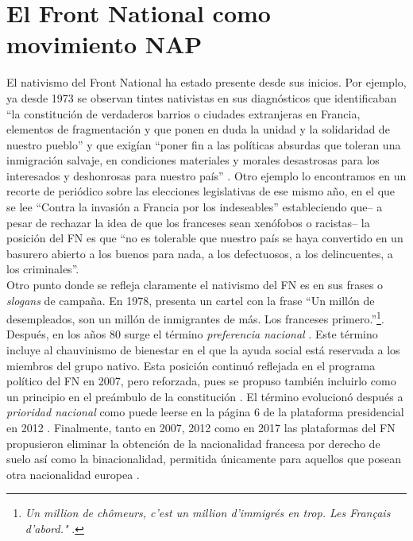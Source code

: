 \section{El Front National como movimiento NAP}

El nativismo del Front National ha estado presente desde sus inicios. Por ejemplo, ya desde 1973 se observan tintes nativistas en sus diagnósticos que identificaban ``la constitución de verdaderos barrios o ciudades extranjeras en Francia, elementos de fragmentación y que ponen en duda la unidad y la solidaridad de nuestro pueblo'' y que exigían ``poner fin a las políticas absurdas que toleran una inmigración salvaje, en condiciones materiales y morales desastrosas para los interesados y deshonrosas para nuestro país'' \parencite[traducción propia]{LeMonde12}. Otro ejemplo lo encontramos en un recorte de periódico sobre las elecciones legislativas de ese mismo año, en el que se lee ``Contra la invasión a Francia por los indeseables'' estableciendo que-- a pesar de rechazar la idea de que los franceses sean xenófobos o racistas-- la posición del FN es que ``no es tolerable que nuestro país se haya convertido en un basurero abierto a los buenos para nada, a los defectuosos, a los delincuentes, a los criminales''\parencite[traducciones propias]{LeTemps17}.\\

Otro punto donde se refleja claramente el nativismo del FN es en sus frases o \textit{slogans} de campaña. En 1978, presenta un cartel con la frase ``Un millón de desempleados, son un millón de inmigrantes de más. Los franceses primero.''\footnote{\textit{Un million de chômeurs, c'est un million d'immigrés en trop. Les Français d'abord."} \parencite{LeMonde12}.}. Después, en los años 80 surge el término \textit{preferencia nacional} \parencite{LeTemps17}. Este término incluye al chauvinismo de bienestar en el que la ayuda social está reservada a los miembros del grupo nativo. Esta posición continuó reflejada en el programa político del FN en 2007, pero reforzada, pues se propuso también incluirlo como un principio en el preámbulo de la constitución \parencite{LObs07}. El término evolucionó después a \textit{prioridad nacional} como puede leerse en la página  6 de la plataforma presidencial en 2012 \parencite{LePen12}. Finalmente, tanto en 2007, 2012 como en 2017 las plataformas del FN propusieron eliminar la obtención de la nacionalidad francesa por derecho de suelo así como la binacionalidad, permitida únicamente para aquellos que posean otra nacionalidad europea \parencites{LObs07}{LePen12}{BBC17}.\\


